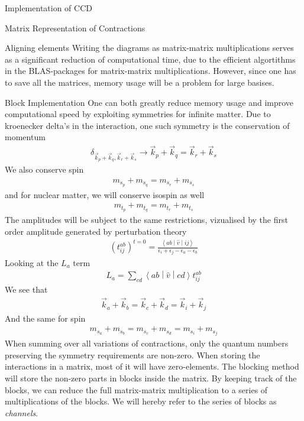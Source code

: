 \documentclass[twoside,english]{uiofysmaster}
\begin{document}
\begin{chapter}{Implementation of CCD}
\begin{section}{Matrix Representation of Contractions}
\begin{subsection}{Aligning elements}
			Writing the diagrams as matrix-matrix multiplications serves as a significant reduction of computational time, due to the efficient algortithms in the BLAS-packages for matrix-matrix multiplications. However, since one has to save all the matrices, memory usage will be a problem for large basises. 
		\end{subsection}

	\end{section}

	\begin{section}{Block Implementation}
		One can both greatly reduce memory usage and improve computational speed by exploiting symmetries for infinite matter. Due to kroenecker delta's in the interaction, one such symmetry is the conservation of momentum
		\begin{align}
			\delta_{\vec k_p + \vec k_q, \vec k_r + \vec k_s} \rightarrow \vec k_p + \vec k_q = \vec k_r + \vec k_s
		\end{align}
		We also conserve spin 
		\begin{align}
			m_{s_p} + m_{s_q} = m_{s_r} + m_{s_s}
		\end{align}
		and for nuclear matter, we will conserve isospin as well
		\begin{align}
			m_{t_p} + m_{t_q} = m_{t_r} + m_{t_s}
		\end{align}
		The amplitudes will be subject to the same restrictions, vizualised by the first order amplitude generated by perturbation theory
		\begin{align}
			(t_{ij}^{ab})^{t=0} = \frac{\left<ab\middle|\hat v\middle|ij\right>}{\epsilon_i + \epsilon_j - \epsilon_a - \epsilon_b}
		\end{align}
		Looking at the $L_a$ term
		\begin{align}
			L_a = \sum_{cd} \left<ab\middle|\hat v\middle|cd\right> t_{ij}^{ab}
		\end{align}
		We see that 
		\begin{align}
			\vec k_a + \vec k_b = \vec k_c + \vec k_d = \vec k_i + \vec k_j
		\end{align}
		And the same for spin
		\begin{align}
			m_{s_a} + m_{s_b} = m_{s_c} + m_{s_d} = m_{s_i} + m_{s_j} 
		\end{align}
		When summing over all variations of contractions, only the quantum numbers preserving the symmetry requirements are non-zero. When storing the interactions in a matrix, most of it will have zero-elements. The blocking method will store the non-zero parts in blocks inside the matrix. By keeping track of the blocks, we can reduce the full matrix-matrix multiplication to a series of multiplications of the blocks. We will hereby refer to the series of blocks as \textit{channels}.


\end{section}
\end{chapter}
\end{document}
